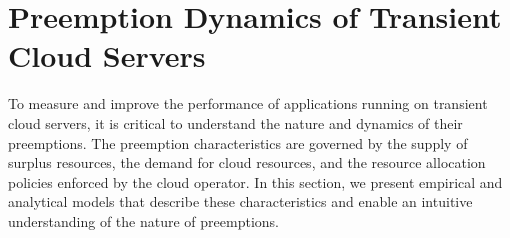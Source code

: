 \section{Preemption Dynamics of Transient Cloud Servers}
\label{sec:preemption-dynamics}



To measure and improve the performance of applications running on transient cloud servers, it is critical to understand the nature and dynamics of their preemptions.
The preemption characteristics are governed by the supply of surplus resources, the demand for cloud resources, and the resource allocation policies enforced by the cloud operator.
In this section, we present empirical and analytical models that describe these characteristics and enable an intuitive understanding of the nature of preemptions. 







